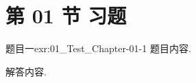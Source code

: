 \section{第 01 节 习题}


\begin{exercise}{题目一}{exr:01_Test_Chapter-01-1}
    题目内容.
\end{exercise}

\begin{solution}
    解答内容.
\end{solution}
